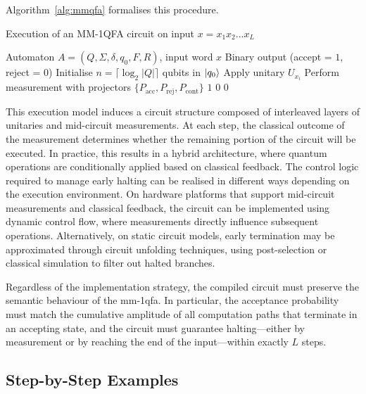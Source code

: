\medskip

Algorithm~\ref{alg:mmqfa} formalises this procedure.

\begin{algorithm}[H]
\caption{Execution of an MM-1QFA circuit on input $x = x_1x_2\dots x_L$}
\label{alg:mmqfa}
\begin{algorithmic}[1]
\Require Automaton $A = (Q, \Sigma, \delta, q_0, F, R)$, input word $x$
\Ensure Binary output (accept = $1$, reject = $0$)
\State Initialise $n = \lceil \log_2 |Q| \rceil$ qubits in $\ket{q_0}$
   \State Apply unitary $U_{x_i}$
   \State Perform measurement with projectors $\{P_{\text{acc}}, P_{\text{rej}}, P_{\text{cont}}\}$
      \State \Return $1$
      \State \Return $0$
   \EndIf
\EndFor
\State \Return $0$ 
\end{algorithmic}
\end{algorithm}

\medskip

\noindent
This execution model induces a circuit structure composed of interleaved layers of unitaries and mid-circuit measurements. At each step, the classical outcome of the measurement determines whether the remaining portion of the circuit will be executed. In practice, this results in a hybrid architecture, where quantum operations are conditionally applied based on classical feedback. The control logic required to manage early halting can be realised in different ways depending on the execution environment. On hardware platforms that support mid-circuit measurements and classical feedback, the circuit can be implemented using dynamic control flow, where measurements directly influence subsequent operations. Alternatively, on static circuit models, early termination may be approximated through circuit unfolding techniques, using post-selection or classical simulation to filter out halted branches.

Regardless of the implementation strategy, the compiled circuit must preserve the semantic behaviour of the \gls{mm-1qfa}. In particular, the acceptance probability must match the cumulative amplitude of all computation paths that terminate in an accepting state, and the circuit must guarantee halting—either by measurement or by reaching the end of the input—within exactly $L$ steps.

\subsection{Step-by-Step Examples}

